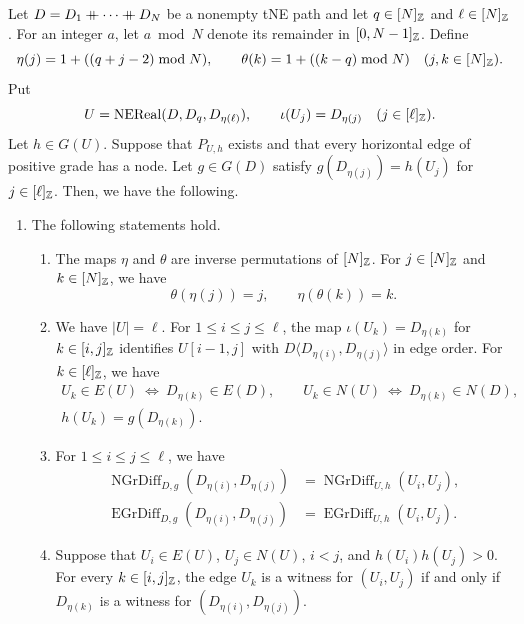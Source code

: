 \begin{lemma}\label{lem:cyclic-witness-extension}
Let $D=D_1\mathbin{+\mkern-10mu+}\cdots\mathbin{+\mkern-10mu+} D_N$ be a nonempty tNE path and let $q\in[N]_{\mathbb Z}$ and $\ell\in[N]_{\mathbb Z}$.
For an integer $a$, let $a\bmod N$ denote its remainder in $[0,N-1]_{\mathbb Z}$.
Define
\[
 \eta(j)=1+((q+j-2)\bmod N),\qquad
 \theta(k)=1+((k-q)\bmod N)\quad(j,k\in[N]_{\mathbb Z}).
\]
Put
\[
 U=\operatorname{NEReal}(D,D_q,D_{\eta(\ell)}),\qquad
 \iota(U_j)=D_{\eta(j)}\quad(j\in[\ell]_{\mathbb Z}).
\]
Let $h\in G(U)$. Suppose that $P_{U,h}$ exists and that every horizontal
edge of positive grade has a node. Let $g\in G(D)$ satisfy
$g(D_{\eta(j)})=h(U_j)$ for $j\in[\ell]_{\mathbb Z}$.
Then, we have the following.
\begin{enumerate}
\item\label{c:cyclic-witness-order} The following statements hold.
\begin{enumerate}[label=(\alph*),ref=\theenumi(\alph*)]
\item\label{c:cyclic-inverse-indices} The maps $\eta$ and $\theta$ are inverse permutations of $[N]_{\mathbb Z}$. For $j\in[N]_{\mathbb Z}$ and $k\in[N]_{\mathbb Z}$, we have
\[
 \theta(\eta(j))=j,\qquad \eta(\theta(k))=k.
\]
\item\label{c:cyclic-interval-order} We have $|U|=\ell$.
For $1\le i\le j\le\ell$, the map $\iota(U_k)=D_{\eta(k)}$ for $k\in[i,j]_{\mathbb Z}$ identifies $U[i-1,j]$ with $D\langle D_{\eta(i)},D_{\eta(j)}\rangle$ in edge order.
For $k\in[\ell]_{\mathbb Z}$, we have
\[
 \begin{gathered}
 U_k\in E(U)\ \Longleftrightarrow\ D_{\eta(k)}\in E(D),\qquad
 U_k\in N(U)\ \Longleftrightarrow\ D_{\eta(k)}\in N(D),\\
 h(U_k)=g(D_{\eta(k)}).
 \end{gathered}
\]
\item\label{c:cyclic-defect-identities} For $1\le i\le j\le\ell$, we have
\[
 \begin{aligned}
 \operatorname{NGrDiff}_{D,g}(D_{\eta(i)},D_{\eta(j)})
 &=\operatorname{NGrDiff}_{U,h}(U_i,U_j),\\
 \operatorname{EGrDiff}_{D,g}(D_{\eta(i)},D_{\eta(j)})
 &=\operatorname{EGrDiff}_{U,h}(U_i,U_j).
 \end{aligned}
\]
\item\label{c:cyclic-witness-bijection} Suppose that $U_i\in E(U)$, $U_j\in N(U)$, $i<j$, and $h(U_i)h(U_j)>0$.
For every $k\in[i,j]_{\mathbb Z}$, the edge $U_k$ is a witness for $(U_i,U_j)$ if and only if $D_{\eta(k)}$ is a witness for $(D_{\eta(i)},D_{\eta(j)})$.

\end{enumerate}
\end{enumerate}
\end{lemma}
